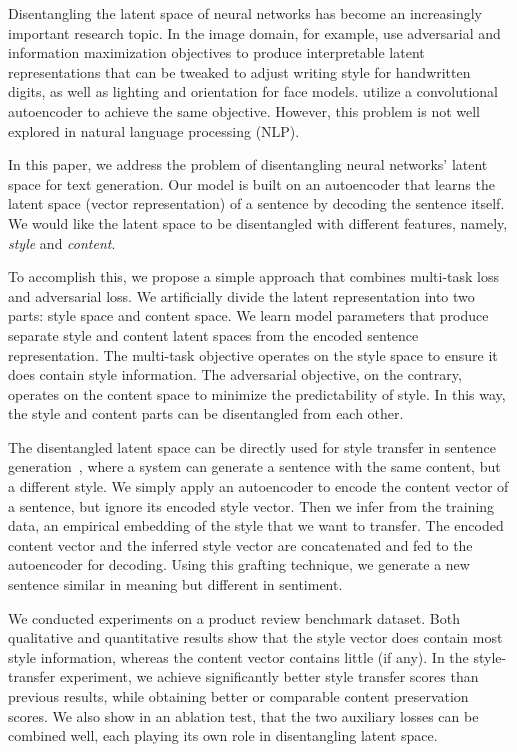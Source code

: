 \documentclass[11pt,a4paper]{article}
\begin{document}
Disentangling the latent space of neural networks has become an increasingly important research topic. In the image domain, for example,  use adversarial and information maximization objectives to produce interpretable latent representations that can be tweaked to adjust writing style for handwritten digits, as well as lighting and orientation for face models.  utilize a convolutional autoencoder to achieve the same objective. However, this problem is not well explored in natural language processing (NLP).

In this paper, we address the problem of disentangling neural networks' latent space for text generation. Our model is built on an autoencoder that learns the latent space (vector representation) of a sentence by decoding the sentence itself. We would like the latent space to be disentangled with different features, namely, \textit{style} and \textit{content}.

To accomplish this, we propose a simple approach that combines multi-task loss and adversarial loss. We artificially divide the latent representation into two parts: style space and content space.
We learn model parameters that produce separate style and content latent spaces from the encoded sentence representation. The multi-task objective operates on the style space to ensure it does contain style information.
The adversarial objective, on the contrary, operates on the content space to minimize the predictability of style. In this way, the style and content parts can be disentangled from each other.

The disentangled latent space can be directly used for style transfer in sentence generation~\cite{fu2017style,shen2017style}, where a system can generate a sentence with the same content, but a different style. We simply apply an autoencoder to encode the content vector of a sentence, but ignore its encoded style vector. Then we infer from the training data, an empirical embedding of the style that we want to transfer. The encoded content vector and the inferred style vector are concatenated and fed to the autoencoder for decoding. Using this grafting technique, we generate a new sentence similar in meaning but different in sentiment.

We conducted experiments on a product review benchmark dataset. Both qualitative and quantitative results show that the style vector does contain most style information, whereas the content vector contains little (if any). In the style-transfer experiment, we achieve significantly better style transfer scores than previous results, while obtaining better or comparable content preservation scores.  We also show in an ablation test, that the two auxiliary losses can be combined well, each playing its own role in disentangling latent space.
\end{document}
